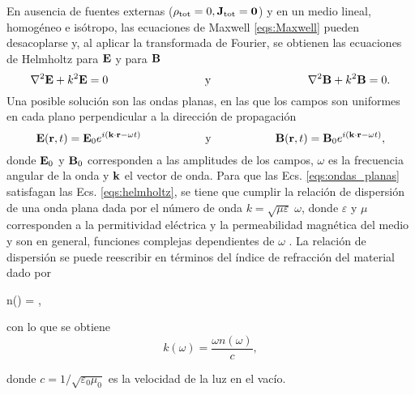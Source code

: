 En ausencia de fuentes externas ($ \rho_{\text{tot}} = 0, \vb{J}_{\text{tot}} = \vb{0}$) y en un medio lineal, homogéneo e isótropo, las ecuaciones de Maxwell \eqref{eqs:Maxwell} pueden desacoplarse y, al aplicar la transformada de Fourier, se obtienen las ecuaciones de Helmholtz para $\vb{E}$ y para $\vb{B}$ \cite{jacksonClassicalElectrodynamics2021a}
%
\begin{equation}
	\laplacian{\vb{E}}+k^2\vb{E}=0\hspace{3cm}\text{y}\hspace{3cm} \laplacian{\vb{B}}+k^2\vb{B}=0.
	\label{eqs:helmholtz}
\end{equation}
%
Una posible solución son las ondas planas, en las que los campos son uniformes en cada plano perpendicular a la dirección de propagación \cite{griffithsIntroductionElectrodynamics2023b}
%
\begin{equation}
	\vb{E}(\vb{r},t) =\vb{E}_0 e^{i(\vb{k}\cdot\vb{r} -\omega t)}\hspace{2cm}\text{y}\hspace{2cm} \vb{B}(\vb{r}, t) =\vb{B}_0 e^{i(\vb{k}\cdot\vb{r} -\omega t)},	
	\label{eqs:ondas_planas}
\end{equation}
%
\noindent donde $\vb{E}_0$ y $\vb{B}_0$ corresponden a las amplitudes de los campos, $\omega$ es la frecuencia angular de la onda y $\vb{k}$ el vector de onda. Para que las Ecs. \eqref{eqs:ondas_planas} satisfagan las Ecs. \eqref{eqs:helmholtz}, se tiene que cumplir la relación de dispersión de una onda plana dada por el número de onda $k=\sqrt{\mu\varepsilon}\;\omega$, donde $\varepsilon$ y $\mu$ corresponden a la permitividad eléctrica y la permeabilidad magnética del medio y son en general, funciones complejas dependientes de $\omega$ \cite{jacksonClassicalElectrodynamics2021a}. La relación de dispersión se puede reescribir en términos del índice de refracción del material dado por \cite{jacksonClassicalElectrodynamics2021a}
%
\begin{tcolorbox}
	n(\omega) = ,
	\label{eq:indice} 
\end{tcolorbox}
%	
\noindent con lo que se obtiene
%
\begin{equation}
	k(\omega) =\dfrac{\omega n(\omega)}{c},
	\label{eq:numero_onda} 
\end{equation}

\noindent donde $c=1/\sqrt{\varepsilon_0\mu_0}$ es la velocidad de la luz en el vacío.

